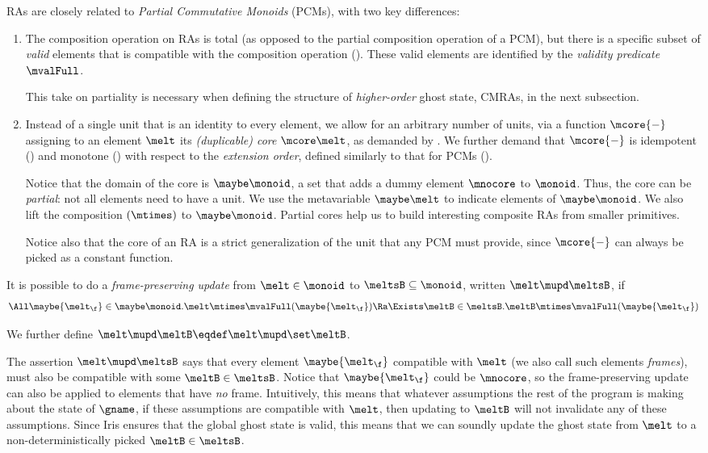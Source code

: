 RAs are closely related to \emph{Partial Commutative Monoids} (PCMs), with two key differences:
\begin{enumerate}
\item The composition operation on RAs is total (as opposed to the partial composition operation of a PCM), but there is a specific subset of \emph{valid} elements that is compatible with the composition operation ().
These valid elements are identified by the \emph{validity predicate} $\mvalFull$.

This take on partiality is necessary when defining the structure of \emph{higher-order} ghost state, CMRAs, in the next subsection.

\item Instead of a single unit that is an identity to every element, we allow
for an arbitrary number of units, via a function $\mcore{{-}}$ assigning to an element $\melt$ its \emph{(duplicable) core} $\mcore\melt$, as demanded by .
  We further demand that $\mcore{{-}}$ is idempotent () and monotone () with respect to the \emph{extension order}, defined similarly to that for PCMs ().

  Notice that the domain of the core is $\maybe\monoid$, a set that adds a dummy element $\mnocore$ to $\monoid$.
  Thus, the core can be \emph{partial}: not all elements need to have a unit.
  We use the metavariable $\maybe\melt$ to indicate elements of  $\maybe\monoid$.
  We also lift the composition $(\mtimes)$ to $\maybe\monoid$.
  Partial cores help us to build interesting composite RAs from smaller primitives.

Notice also that the core of an RA is a strict generalization of the unit that any PCM must provide, since $\mcore{{-}}$ can always be picked as a constant function.
\end{enumerate}


\begin{defn}
  It is possible to do a \emph{frame-preserving update} from $\melt \in \monoid$ to $\meltsB \subseteq \monoid$, written $\melt \mupd \meltsB$, if
  \[ \All \maybe{\melt_\f} \in \maybe\monoid. \melt \mtimes \mvalFull(\maybe{\melt_\f}) \Ra \Exists \meltB \in \meltsB. \meltB \mtimes \mvalFull(\maybe{\melt_\f}) \]

  We further define $\melt \mupd \meltB \eqdef \melt \mupd \set\meltB$.
\end{defn}
The assertion $\melt \mupd \meltsB$ says that every element $\maybe{\melt_\f}$ compatible with $\melt$ (we also call such elements \emph{frames}), must also be compatible with some $\meltB \in \meltsB$.
Notice that $\maybe{\melt_\f}$ could be $\mnocore$, so the frame-preserving update can also be applied to elements that have \emph{no} frame.
Intuitively, this means that whatever assumptions the rest of the program is making about the state of $\gname$, if these assumptions are compatible with $\melt$, then updating to $\meltB$ will not invalidate any of these assumptions.
Since Iris ensures that the global ghost state is valid, this means that we can soundly update the ghost state from $\melt$ to a non-deterministically picked $\meltB \in \meltsB$.


